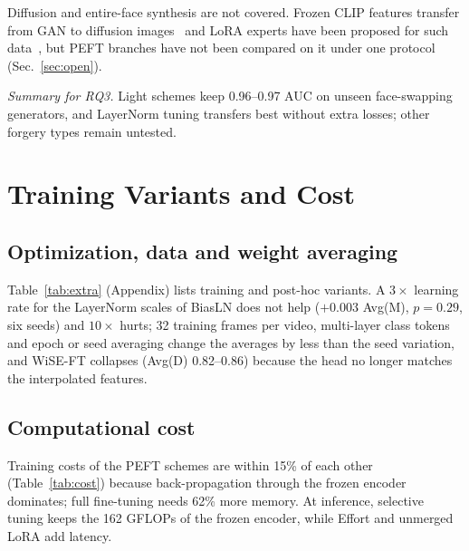 \documentclass[fonts]{icst}
\begin{document}
Diffusion and entire-face synthesis are not covered. Frozen CLIP features transfer from GAN to diffusion images~\cite{ojha2023universal} and LoRA experts have been proposed for such data~\cite{liu2024mole}, but PEFT branches have not been compared on it under one protocol (Sec.~\ref{sec:open}).

\textit{Summary for RQ3.} Light schemes keep 0.96--0.97 AUC on unseen face-swapping generators, and LayerNorm tuning transfers best without extra losses; other forgery types remain untested.

\section{Training Variants and Cost}
\label{sec:variants}

\subsection{Optimization, data and weight averaging}
\label{sec:extra}
Table~\ref{tab:extra} (Appendix) lists training and post-hoc variants. A $3\times$ learning rate for the LayerNorm scales of BiasLN does not help ($+0.003$ Avg(M), $p=0.29$, six seeds) and $10\times$ hurts; 32 training frames per video, multi-layer class tokens and epoch or seed averaging change the averages by less than the seed variation, and WiSE-FT collapses (Avg(D) 0.82--0.86) because the head no longer matches the interpolated features.

\subsection{Computational cost}
\label{sec:cost}
Training costs of the PEFT schemes are within 15\% of each other (Table~\ref{tab:cost}) because back-propagation through the frozen encoder dominates; full fine-tuning needs 62\% more memory. At inference, selective tuning keeps the 162 GFLOPs of the frozen encoder, while Effort and unmerged LoRA add latency.


\end{document}
